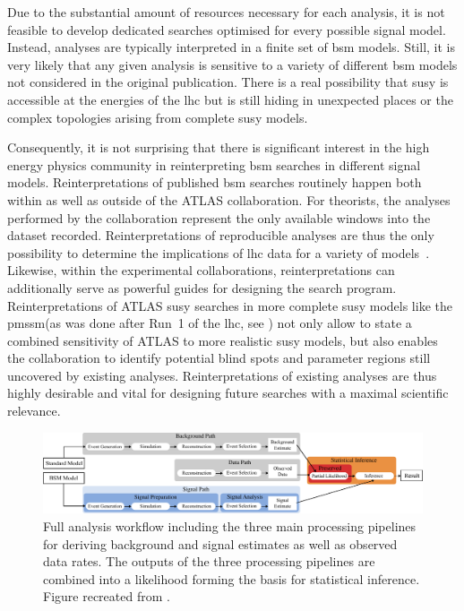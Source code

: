 Due to the substantial amount of resources necessary for each analysis, it is not feasible to develop dedicated searches optimised for every possible signal model. Instead, analyses are typically interpreted in a finite set of \gls{bsm} models. Still, it is very likely that any given analysis is sensitive to a variety of different \gls{bsm} models not considered in the original publication. There is a real possibility that \gls{susy} is accessible at the energies of the \gls{lhc} but is still hiding in unexpected places or the complex topologies arising from complete \gls{susy} models. 

Consequently, it is not surprising that there is significant interest in the high energy physics community in reinterpreting \gls{bsm} searches in different signal models. Reinterpretations of published \gls{bsm} searches routinely happen both within as well as outside of the ATLAS collaboration. For theorists, the analyses performed by the collaboration represent the only available windows into the dataset recorded. Reinterpretations of reproducible analyses are thus the only possibility to determine the implications of \gls{lhc} data for a variety of models~\cite{reinterpretation_workshop}. Likewise, within the experimental collaborations, reinterpretations can additionally serve as powerful guides for designing the search program. Reinterpretations of ATLAS \gls{susy} searches in more complete \gls{susy} models like the \gls{pmssm}(as was done after Run~1 of the \gls{lhc}, see \cite{pMSSM-scan-run1:2015baa}) not only allow to state a combined sensitivity of ATLAS to more realistic \gls{susy} models, but also enables the collaboration to identify potential blind spots and parameter regions still uncovered by existing analyses. Reinterpretations of existing analyses are thus highly desirable and vital for designing future searches with a maximal scientific relevance.  

 \begin{figure}
	\centering\includegraphics[width=\textwidth]{pipeline}
	\caption{Full analysis workflow including the three main processing pipelines for deriving background and signal estimates as well as observed data rates. The outputs of the three processing pipelines are combined into a likelihood forming the basis for statistical inference. Figure recreated from \cite{ATL-PHYS-PUB-2019-032}.}
	\label{fig:pipeline_analysis}
\end{figure}

